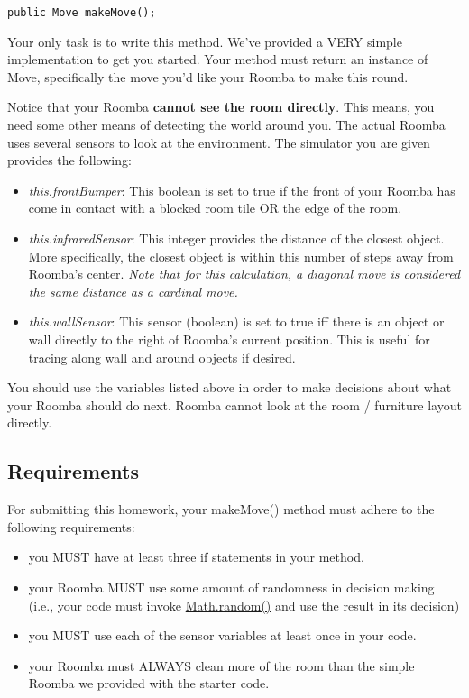 \documentclass[paper=a4, fontsize=11pt, parskip=full]{scrartcl} %
\numberwithin{equation}{section} %
\numberwithin{figure}{section} %
\numberwithin{table}{section} %
\begin{document}
\begin{lstlisting}
public Move makeMove();
\end{lstlisting}

Your only task is to write this method. We've provided a VERY simple implementation to get you started. Your method must return an instance of Move, specifically the move you'd like your Roomba to make this round.

Notice that your Roomba \textbf{cannot see the room directly}. This means, you need some other means of detecting the world around you. The actual Roomba uses several sensors to look at the environment. The simulator you are given provides the following:

\begin{itemize}
\item \emph{this.frontBumper}: This boolean is set to true if the front of your Roomba has come in contact with a blocked room tile OR the edge of the room.
\item \emph{this.infraredSensor}: This integer provides the distance of the closest object. More specifically, the closest object is within this number of steps away from Roomba's center. \emph{Note that for this calculation, a diagonal move is considered the same distance as a cardinal move.}
\item \emph{this.wallSensor}: This sensor (boolean) is set to true iff there is an object or wall directly to the right of Roomba's current position. This is useful for tracing along wall and around objects if desired.
\end{itemize}

You should use the variables listed above in order to make decisions about what your Roomba should do next. Roomba cannot look at the room / furniture layout directly.

\subsection{Requirements}

For submitting this homework, your makeMove() method must adhere to the following requirements:

\begin{itemize}
	\item you MUST have at least three if statements in your method.
	\item your Roomba MUST use some amount of randomness in decision making (i.e., your code must invoke \href{https://docs.oracle.com/javase/8/docs/api/java/lang/Math.html#random--}{Math.random()} and use the result in its decision)
	\item you MUST use each of the sensor variables at least once in your code.
	\item your Roomba must ALWAYS clean more of the room than the simple Roomba we provided with the starter code.
\end{itemize}



\end{document}
